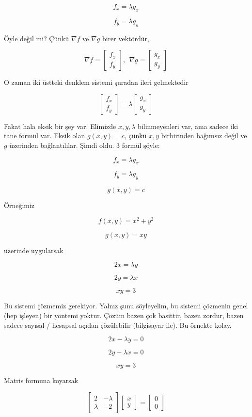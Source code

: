 \documentclass[12pt,fleqn]{article}\usepackage{../../common}
\begin{document}
$$ f_x = \lambda g_x $$

$$ f_y = \lambda g_y $$

Öyle değil mi? Çünkü $\nabla f$ ve $\nabla g$ birer vektördür, 

$$ 
\nabla f =
\left[\begin{array}{r}
f_x \\
f_y
\end{array}\right], \ \ 
\nabla g =
\left[\begin{array}{r}
g_x \\
g_y
\end{array}\right]
$$

O zaman iki üstteki denklem sistemi şuradan ileri gelmektedir

$$ 
\left[\begin{array}{r}
f_x \\
f_y
\end{array}\right]  = 
\lambda
\left[\begin{array}{r}
g_x \\
g_y
\end{array}\right]
$$

Fakat hala eksik bir şey var. Elimizde $x,y,\lambda$ bilinmeyenleri var,
ama sadece iki tane formül var. Eksik olan $g(x,y) = c$, çünkü $x,y$
birbirinden bağımsız değil ve $g$ üzerinden bağlantılılar. Şimdi oldu. 3
formül şöyle:

$$ f_x = \lambda g_x $$

$$ f_y = \lambda g_y $$

$$ g(x,y) = c $$

Örneğimiz 

$$ f(x,y) = x^2 + y^2 $$

$$ g(x,y) = xy  $$

üzerinde uygularsak

$$ 2x = \lambda y $$

$$ 2y = \lambda x $$

$$ xy = 3 $$

Bu sistemi çözmemiz gerekiyor. Yalnız şunu söyleyelim, bu sistemi çözmenin genel
(hep işleyen) bir yöntemi yoktur. Çözüm bazen çok basittir, bazen zordur, bazen
sadece sayısal / hesapsal açıdan çözülebilir (bilgisayar ile). Bu örnekte kolay.

$$ 2x - \lambda y = 0$$

$$ 2y - \lambda x = 0 $$

$$ xy = 3 $$

Matris formuna koyarsak

$$ 
\left[\begin{array}{rr}
2 & -\lambda \\
\lambda & -2
\end{array}\right]
\left[\begin{array}{r}
x \\ y
\end{array}\right]
=
\left[\begin{array}{r}
0 \\ 0
\end{array}\right]
 $$
\end{document}
